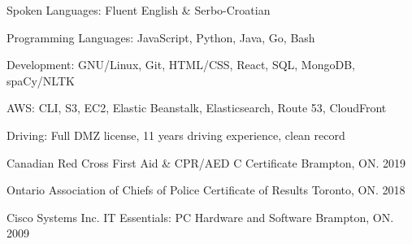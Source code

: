

\begin{cvhonors}

  \cvhonor
    {Spoken Languages:} %
    {Fluent English \& Serbo-Croatian} %
    {} %
    {} %

  \cvhonor
    {Programming Languages:} %
    {JavaScript, Python, Java, Go, Bash} %
    {} %
    {} %

  \cvhonor
    {Development:} %
    {GNU/Linux, Git, HTML/CSS, React, SQL, MongoDB, spaCy/NLTK} %
    {} %
    {} %

  \cvhonor
    {AWS:} %
    {CLI, S3, EC2, Elastic Beanstalk, Elasticsearch, Route 53, CloudFront} %
    {} %
    {} %

  \cvhonor
    {Driving:} %
    {Full DMZ license, 11 years driving experience, clean record} %
    {} %
    {} %

  \cvhonor
    {Canadian Red Cross} %
    {First Aid \& CPR/AED C Certificate} %
    {Brampton, ON.} %
    {2019} %

  \cvhonor
    {Ontario Association of Chiefs of Police} %
    {Certificate of Results} %
    {Toronto, ON.} %
    {2018} %

  \cvhonor
    {Cisco Systems Inc.} %
    {IT Essentials: PC Hardware and Software} %
    {Brampton, ON.} %
    {2009} %

\end{cvhonors}